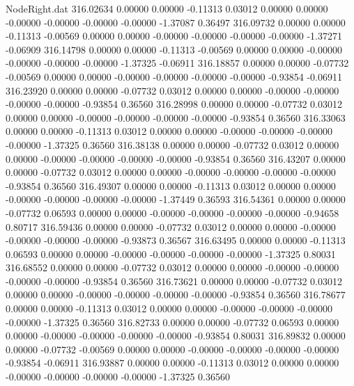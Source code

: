 \begin{filecontents}{NodeRight.dat}
 316.02634    0.00000    0.00000    -0.11313    0.03012    0.00000    0.00000   -0.00000   -0.00000   -0.00000   -0.00000   -1.37087    0.36497
 316.09732    0.00000    0.00000    -0.11313   -0.00569    0.00000    0.00000   -0.00000   -0.00000   -0.00000   -0.00000   -1.37271   -0.06909
 316.14798    0.00000    0.00000    -0.11313   -0.00569    0.00000    0.00000   -0.00000   -0.00000   -0.00000   -0.00000   -1.37325   -0.06911
 316.18857    0.00000    0.00000    -0.07732   -0.00569    0.00000    0.00000   -0.00000   -0.00000   -0.00000   -0.00000   -0.93854   -0.06911
 316.23920    0.00000    0.00000    -0.07732    0.03012    0.00000    0.00000   -0.00000   -0.00000   -0.00000   -0.00000   -0.93854    0.36560
 316.28998    0.00000    0.00000    -0.07732    0.03012    0.00000    0.00000   -0.00000   -0.00000   -0.00000   -0.00000   -0.93854    0.36560
 316.33063    0.00000    0.00000    -0.11313    0.03012    0.00000    0.00000   -0.00000   -0.00000   -0.00000   -0.00000   -1.37325    0.36560
 316.38138    0.00000    0.00000    -0.07732    0.03012    0.00000    0.00000   -0.00000   -0.00000   -0.00000   -0.00000   -0.93854    0.36560
 316.43207    0.00000    0.00000    -0.07732    0.03012    0.00000    0.00000   -0.00000   -0.00000   -0.00000   -0.00000   -0.93854    0.36560
 316.49307    0.00000    0.00000    -0.11313    0.03012    0.00000    0.00000   -0.00000   -0.00000   -0.00000   -0.00000   -1.37449    0.36593
 316.54361    0.00000    0.00000    -0.07732    0.06593    0.00000    0.00000   -0.00000   -0.00000   -0.00000   -0.00000   -0.94658    0.80717
 316.59436    0.00000    0.00000    -0.07732    0.03012    0.00000    0.00000   -0.00000   -0.00000   -0.00000   -0.00000   -0.93873    0.36567
 316.63495    0.00000    0.00000    -0.11313    0.06593    0.00000    0.00000   -0.00000   -0.00000   -0.00000   -0.00000   -1.37325    0.80031
 316.68552    0.00000    0.00000    -0.07732    0.03012    0.00000    0.00000   -0.00000   -0.00000   -0.00000   -0.00000   -0.93854    0.36560
 316.73621    0.00000    0.00000    -0.07732    0.03012    0.00000    0.00000   -0.00000   -0.00000   -0.00000   -0.00000   -0.93854    0.36560
 316.78677    0.00000    0.00000    -0.11313    0.03012    0.00000    0.00000   -0.00000   -0.00000   -0.00000   -0.00000   -1.37325    0.36560
 316.82733    0.00000    0.00000    -0.07732    0.06593    0.00000    0.00000   -0.00000   -0.00000   -0.00000   -0.00000   -0.93854    0.80031
 316.89832    0.00000    0.00000    -0.07732   -0.00569    0.00000    0.00000   -0.00000   -0.00000   -0.00000   -0.00000   -0.93854   -0.06911
 316.93887    0.00000    0.00000    -0.11313    0.03012    0.00000    0.00000   -0.00000   -0.00000   -0.00000   -0.00000   -1.37325    0.36560

\end{filecontents}
